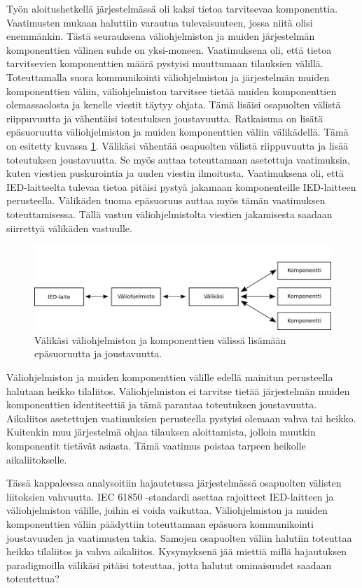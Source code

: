 Työn aloitushetkellä järjestelmässä oli kaksi tietoa tarvitsevaa komponenttia. Vaatimusten mukaan haluttiin varautua tulevaisuuteen, jossa niitä olisi enemmänkin. Tästä seurauksena väliohjelmiston ja muiden järjestelmän komponenttien välinen suhde on yksi-moneen. Vaatimuksena oli, että tietoa tarvitsevien komponenttien määrä pystyisi muuttumaan tilauksien välillä. Toteuttamalla suora kommunikointi väliohjelmiston ja järjestelmän muiden komponenttien väliin, väliohjelmiston tarvitsee tietää muiden komponenttien olemassaolosta ja kenelle viestit täytyy ohjata. Tämä lisäisi osapuolten välistä riippuvuutta ja vähentäisi toteutuksen joustavuutta. Ratkaisuna on lisätä epäsuoruutta väliohjelmiston ja muiden komponenttien väliin välikädellä. Tämä on esitetty kuvassa \ref{fig:coupling-analysis}. Välikäsi vähentää osapuolten välistä riippuvuutta ja lisää toteutuksen joustavuutta. Se myös auttaa toteuttamaan asetettuja vaatimuksia, kuten viestien puskurointia ja uuden viestin ilmoitusta. Vaatimuksena oli, että IED-laitteelta tulevaa tietoa pitäisi pystyä jakamaan komponenteille IED-laitteen perusteella. Välikäden tuoma epäsuoruus auttaa myös tämän vaatimuksen toteuttamisessa. Tällä vastuu väliohjelmistolta viestien jakamisesta saadaan siirrettyä välikäden vastuulle.

\begin{figure}[ht!]
	\includegraphics[width=1\textwidth]{pictures/coupling-analysis.png}
	\caption{Välikäsi väliohjelmiston ja komponenttien välissä lisämään epäsuoruutta ja joustavuutta.}
	\label{fig:coupling-analysis}
\end{figure}

Väliohjelmiston ja muiden komponenttien välille edellä mainitun perusteella halutaan heikko tilaliitos. Väliohjelmiston ei tarvitse tietää järjestelmän muiden komponenttien identiteettiä ja tämä parantaa toteutuksen joustavuutta. Aikaliitos asetettujen vaatimuksien perusteella pystyisi olemaan vahva tai heikko. Kuitenkin muu järjestelmä ohjaa tilauksen aloittamista, jolloin muutkin komponentit tietävät asiasta. Tämä vaatimus poistaa tarpeen heikolle aikaliitokselle.

Tässä kappaleessa analysoitiin hajautetussa järjestelmässä osapuolten välisten liitoksien vahvuutta. IEC 61850 -standardi asettaa rajoitteet IED-laitteen ja väliohjelmiston välille, joihin ei voida vaikuttaa. Väliohjelmiston ja muiden komponenttien väliin päädyttiin toteuttamaan epäsuora kommunikointi joustavuuden ja vaatimusten takia. Samojen osapuolten väliin halutiin toteuttaa heikko tilaliitos ja vahva aikaliitos. Kysymyksenä jää miettiä millä hajautuksen paradigmoilla välikäsi pitäisi toteuttaa, jotta halutut ominaisuudet saadaan toteutettua?


